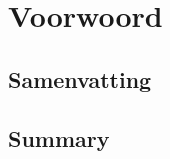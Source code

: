 
\titleformat{\chapter}{\vspace{-1in}}{}{}{\Huge\textbf}
\chapter*{Voorwoord}\thispagestyle{fancy}\vspace{-.35in}

\newpage

\section*{Samenvatting}
\newpage

\section*{Summary}
\newpage